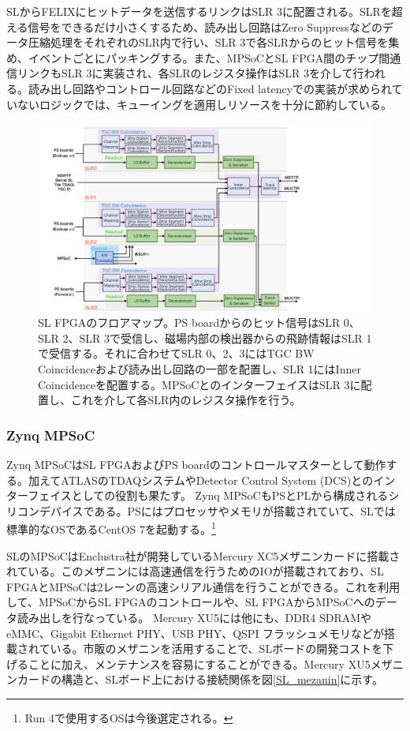 SLからFELIXにヒットデータを送信するリンクはSLR 3に配置される。SLRを超える信号をできるだけ小さくするため、読み出し回路はZero Suppressなどのデータ圧縮処理をそれぞれのSLR内で行い、SLR 3で各SLRからのヒット信号を集め、イベントごとにパッキングする。また、MPSoCとSL FPGA間のチップ間通信リンクもSLR 3に実装され、各SLRのレジスタ操作はSLR 3を介して行われる。読み出し回路やコントロール回路などのFixed latencyでの実装が求められていないロジックでは、キューイングを適用しリソースを十分に節約している。

\begin{figure} 
\centering
\includegraphics[width=16cm]{fig/Intro/SL_floor.pdf}
\caption[SL FPGAのフロアマップ]{SL FPGAのフロアマップ。PS boardからのヒット信号はSLR 0、SLR 2、SLR 3で受信し、磁場内部の検出器からの飛跡情報はSLR 1で受信する。それに合わせてSLR 0、2、3にはTGC BW Coincidenceおよび読み出し回路の一部を配置し、SLR 1にはInner Coincidenceを配置する。MPSoCとのインターフェイスはSLR 3に配置し、これを介して各SLR内のレジスタ操作を行う。}
\label{SL_floor}
\end{figure}



    \subsubsection*{Zynq MPSoC}
Zynq MPSoCはSL FPGAおよびPS boardのコントロールマスターとして動作する。加えてATLASのTDAQシステムやDetector Control System (DCS)とのインターフェイスとしての役割も果たす。
Zynq MPSoCもPSとPLから構成されるシリコンデバイスである。PSにはプロセッサやメモリが搭載されていて、SLでは標準的なOSであるCentOS 7を起動する。\footnote{Run 4で使用するOSは今後選定される。}

SLのMPSoCはEnclustra社が開発しているMercury XC5メザニンカードに搭載されている。このメザニンには高速通信を行うためのIOが搭載されており、SL FPGAとMPSoCは2レーンの高速シリアル通信を行うことができる。これを利用して、MPSoCからSL FPGAのコントロールや、SL FPGAからMPSoCへのデータ読み出しを行なっている。
Mercury XU5には他にも、DDR4 SDRAMやeMMC、Gigabit Ethernet PHY、USB PHY、QSPI フラッシュメモリなどが搭載されている。市販のメザニンを活用することで、SLボードの開発コストを下げることに加え、メンテナンスを容易にすることができる。Mercury XU5メザニンカードの構造と、SLボード上における接続関係を図\ref{SL_mezanin}に示す。

